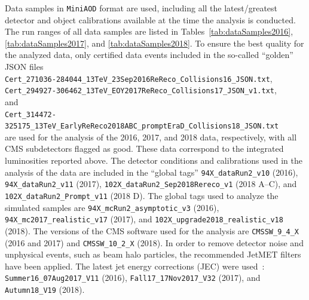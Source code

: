 Data samples in \texttt{MiniAOD} format are used, including all the
latest/greatest detector and object calibrations available at the time
the analysis is conducted.
The run ranges of all data samples are listed in
Tables~\ref{tab:dataSamples2016}, \ref{tab:dataSamples2017}, and
\ref{tab:dataSamples2018}.
To ensure the best quality for the analyzed data, only certified data
events included in the so-called ``golden'' JSON files\\
\texttt{\small Cert\_271036-284044\_13TeV\_23Sep2016ReReco\_Collisions16\_JSON.txt},\\
\texttt{\small Cert\_294927-306462\_13TeV\_EOY2017ReReco\_Collisions17\_JSON\_v1.txt},\\
and\\
\texttt{\small Cert\_314472-325175\_13TeV\_EarlyReReco2018ABC\_promptEraD\_Collisions18\_JSON.txt}\\
are used for the analysis of the 2016, 2017, and 2018 data,
respectively, with all CMS subdetectors flagged as good.
These data correspond to the integrated luminosities reported above.
The detector conditions and calibrations used in the analysis of the
data are included in the ``global tags''
\texttt{\small 94X\_dataRun2\_v10} (2016),
\texttt{\small 94X\_dataRun2\_v11} (2017),
\texttt{\small 102X\_dataRun2\_Sep2018Rereco\_v1} (2018 A--C), and
\texttt{\small 102X\_dataRun2\_Prompt\_v11} (2018 D).
The global tags used to analyze the simulated samples are
\texttt{\small 94X\_mcRun2\_asymptotic\_v3} (2016),
\texttt{\small 94X\_mc2017\_realistic\_v17} (2017), and
\texttt{\small 102X\_upgrade2018\_realistic\_v18} (2018).
The versions of the CMS software used for the analysis are
\texttt{\small CMSSW\_9\_4\_X} (2016 and 2017) and
\texttt{\small CMSSW\_10\_2\_X} (2018).
In order to remove detector noise and unphysical events, such as beam
halo particles, the recommended JetMET
filters~\cite{CMS-PAS-JME-16-004} have been applied.
The latest jet energy corrections (JEC) were used~\cite{jecDataMC}:
\texttt{\small Summer16\_07Aug2017\_V11} (2016),
\texttt{\small Fall17\_17Nov2017\_V32} (2017), and
\texttt{\small Autumn18\_V19} (2018).
